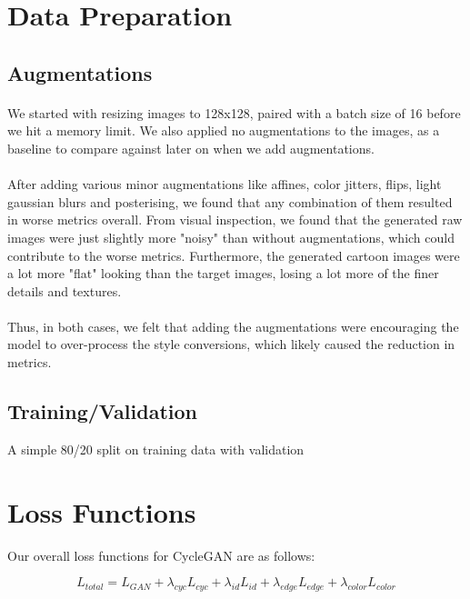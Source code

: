 \documentclass[twoside,english,notitlepage]{report}
\begin{document}
\section{Data Preparation}
\subsection{Augmentations}
\paragraph{} We started with resizing images to 128x128, paired with a batch size of 16 before we hit a memory limit. We also applied no augmentations to the images, as a baseline to compare against later on when we add augmentations.

\paragraph{} After adding various minor augmentations like affines, color jitters, flips, light gaussian blurs and posterising, we found that any combination of them resulted in worse metrics overall. From visual inspection, we found that the generated raw images were just slightly more "noisy" than without augmentations, which could contribute to the worse metrics. Furthermore, the generated cartoon images were a lot more "flat" looking than the target images, losing a lot more of the finer details and textures. 

\paragraph{} Thus, in both cases, we felt that adding the augmentations were encouraging the model to over-process the style conversions, which likely caused the reduction in metrics. 

\subsection{Training/Validation}
A simple 80/20 split on training data with validation



\section{Loss Functions}
Our overall loss functions for CycleGAN are as follows:


\begin{equation}
    L_{total} = L_{GAN} + \lambda_{cyc} L_{cyc} + \lambda_{id} L_{id} + \lambda_{edge} L_{edge} + \lambda_{color} L_{color}
\end{equation}
\end{document}
